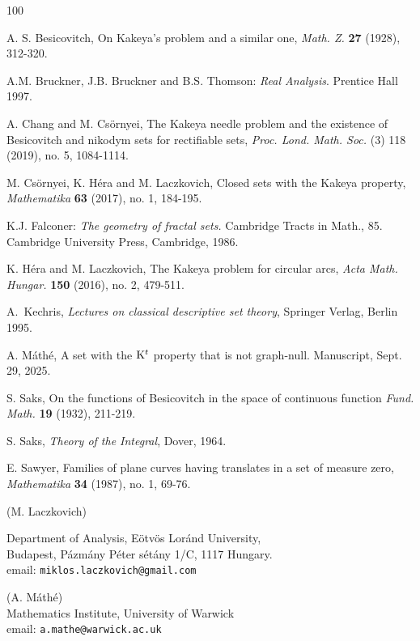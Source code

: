 \documentclass[12pt]{article}
\begin{document}
\begin{thebibliography}{100}

 A. S. Besicovitch, On Kakeya's problem 
and a similar one, {\it Math. Z.} {\bf 27} (1928), 312-320.

 A.M. Bruckner, J.B. Bruckner and B.S. Thomson: {\it Real
Analysis}. Prentice Hall 1997.
  
 A. Chang and M. Cs\"ornyei, The Kakeya needle problem and the
existence of Besicovitch and nikodym sets for rectifiable sets,
{\it Proc. Lond. Math. Soc.} (3) {\bf} 118 (2019), no. 5, 1084-1114.

 M. Cs\"ornyei, K. H\'era and M. Laczkovich,
Closed sets with the Kakeya property, {\it Mathematika} 
{\bf 63} (2017), no. 1, 184-195.

 K.J. Falconer: {\it The geometry of fractal sets.}
Cambridge Tracts in Math., 85. Cambridge University Press, Cambridge, 1986. 

 K. H\'era and M. Laczkovich, The Kakeya problem for 
circular arcs, {\it Acta Math. Hungar.} {\bf 150} (2016), no. 2, 479-511.

 A.~Kechris, \emph{Lectures on classical descriptive set
theory}, Springer Verlag, Berlin 1995.

 A. M\'ath\'e, A set with the ${\rm K}^t$ property that is not
graph-null. Manuscript, Sept. 29, 2025.

 S. Saks, On the functions of Besicovitch in the space of
continuous function {\it Fund. Math.} {\bf 19} (1932), 211-219.
  
 S. Saks, \emph{Theory of the Integral}, Dover, 1964.
  
 E. Sawyer, Families of plane curves having translates in a set of
measure zero, {\it Mathematika} {\bf 34} (1987), no. 1, 69-76. 






\end{thebibliography}

\begin{small}\noindent (M. Laczkovich) \\
{\sc Department of Analysis, E\" otv\" os Lor\' and University,\\  
Budapest, P\' azm\' any 
P\' eter s\' et\' any 1/C, 1117 Hungary. \\
email: {\tt miklos.laczkovich@gmail.com} 
 
\bigskip\noindent (A. M\'ath\'e)\\
Mathematics Institute, University of Warwick\\
email: {\tt a.mathe@warwick.ac.uk}
}
\end{small} 
\end{document}
